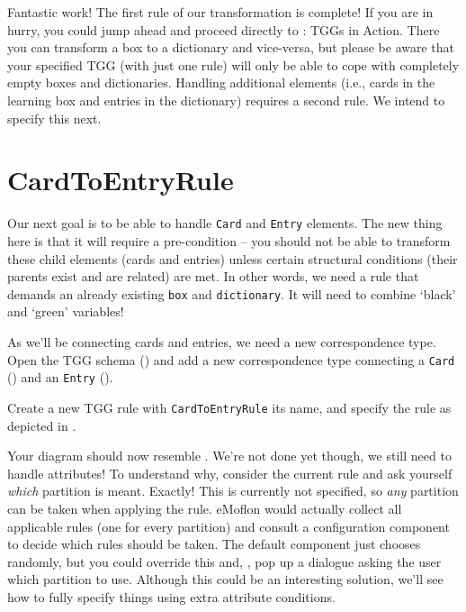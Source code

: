 Fantastic work! The first rule of our transformation is complete! 
If you are in hurry, you could jump ahead and proceed directly to : TGGs in Action. 
There you can transform a box to a dictionary and vice-versa, but please be aware that your specified TGG (with just one rule) will only be able to cope with completely empty boxes and dictionaries. 
Handling additional elements (i.e., cards in the learning box and entries in the dictionary) requires a second rule.
We intend to specify this next.

\section{CardToEntryRule}

Our next goal is to be able to handle \texttt{Card} and \texttt{Entry} elements. 
The new thing here is that it will require a pre-condition -- you should not be able to transform these child elements (cards and entries) unless certain structural conditions (their parents exist and are related) are met. 
In other words, we need a rule that demands an already existing \texttt{box} and \texttt{dictionary}. 
It will need to combine `black' and `green' variables! 

\begin{stepbystep}

\item As we'll be connecting cards and entries, we need a new correspondence type.
Open the TGG schema () and add a new correspondence type  connecting a \texttt{Card} () and an \texttt{Entry} ().

\item Create a new TGG rule with \texttt{CardToEntryRule} its name, and specify the rule as depicted in .
\end{stepbystep}

Your diagram should now resemble . 
We're not done yet though, we still need to handle attributes!
To understand why, consider the current rule and ask yourself  \emph{which} partition is meant.
Exactly!  This is currently not specified, so \emph{any} partition can be taken when applying the rule.
eMoflon would actually collect all applicable rules (one for every partition) and consult a configuration component to decide which rules should be taken.
The default component just chooses randomly, but you could override this and, \eg, pop up a dialogue asking the user which partition to use.
Although this could be an interesting solution, we'll see how to fully specify things using extra attribute conditions.

